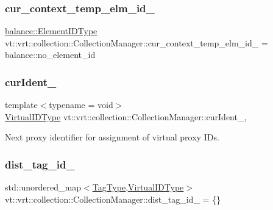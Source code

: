 \subsubsection{\texorpdfstring{cur\+\_\+context\+\_\+temp\+\_\+elm\+\_\+id\+\_\+}{cur\_context\_temp\_elm\_id\_}}
{\footnotesize\ttfamily \hyperlink{namespacevt_1_1vrt_1_1collection_1_1balance_a14c8d2c972f2913aa3f1636e5be0a120}{balance\+::\+Element\+I\+D\+Type} vt\+::vrt\+::collection\+::\+Collection\+Manager\+::cur\+\_\+context\+\_\+temp\+\_\+elm\+\_\+id\+\_\+ = balance\+::no\+\_\+element\+\_\+id\hspace{0.3cm}{\ttfamily [private]}}

\mbox{\label{structvt_1_1vrt_1_1collection_1_1_collection_manager_affaf4ab1e9296a6ff1b7ad3c28a5e04e}} 
\subsubsection{\texorpdfstring{cur\+Ident\+\_\+}{curIdent\_}}
{\footnotesize\ttfamily template$<$typename  = void$>$ \\
\hyperlink{namespacevt_1_1vrt_a84d0891f52f70728c3fc2172cffb464b}{Virtual\+I\+D\+Type} vt\+::vrt\+::collection\+::\+Collection\+Manager\+::cur\+Ident\+\_\+\hspace{0.3cm}{\ttfamily [static]}, {\ttfamily [private]}}



Next proxy identifier for assignment of virtual proxy I\+Ds. 

\mbox{\label{structvt_1_1vrt_1_1collection_1_1_collection_manager_ac6d4e3a2e80c670dc5c31c0c02ec0e1f}} 
\subsubsection{\texorpdfstring{dist\+\_\+tag\+\_\+id\+\_\+}{dist\_tag\_id\_}}
{\footnotesize\ttfamily std\+::unordered\+\_\+map$<$\hyperlink{namespacevt_a84ab281dae04a52a4b243d6bf62d0e52}{Tag\+Type},\hyperlink{namespacevt_1_1vrt_a84d0891f52f70728c3fc2172cffb464b}{Virtual\+I\+D\+Type}$>$ vt\+::vrt\+::collection\+::\+Collection\+Manager\+::dist\+\_\+tag\+\_\+id\+\_\+ = \{\}\hspace{0.3cm}{\ttfamily [private]}}

